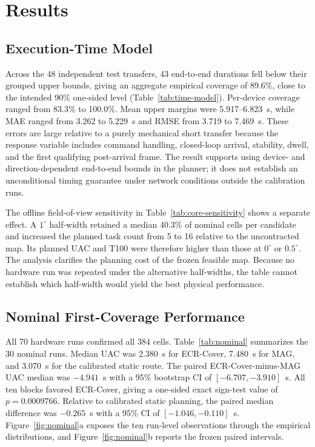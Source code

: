 \section{Results}\label{sec:results}

\subsection{Execution-Time Model}

Across the 48 independent test transfers, 43 end-to-end durations fell below their grouped upper bounds, giving an aggregate empirical coverage of 89.6\%, close to the intended 90\% one-sided level (Table~\ref{tab:time-model}). Per-device coverage ranged from 83.3\% to 100.0\%. Mean upper margins were 5.917--6.823~s, while MAE ranged from 3.262 to 5.229~s and RMSE from 3.719 to 7.469~s. These errors are large relative to a purely mechanical short transfer because the response variable includes command handling, closed-loop arrival, stability, dwell, and the first qualifying post-arrival frame. The result supports using device- and direction-dependent end-to-end bounds in the planner; it does not establish an unconditional timing guarantee under network conditions outside the calibration runs.

The offline field-of-view sensitivity in Table~\ref{tab:core-sensitivity} shows a separate effect. A $1^\circ$ half-width retained a median 40.3\% of nominal cells per candidate and increased the planned task count from 5 to 16 relative to the uncontracted map. Its planned UAC and T100 were therefore higher than those at $0^\circ$ or $0.5^\circ$. The analysis clarifies the planning cost of the frozen feasible map. Because no hardware run was repeated under the alternative half-widths, the table cannot establish which half-width would yield the best physical performance.

\subsection{Nominal First-Coverage Performance}

All 70 hardware runs confirmed all 384 cells. Table~\ref{tab:nominal} summarizes the 30 nominal runs. Median UAC was 2.380~s for ECR-Cover, 7.480~s for MAG, and 3.070~s for the calibrated static route. The paired ECR-Cover-minus-MAG UAC median was $-4.941$~s with a 95\% bootstrap CI of $[-6.707,-3.910]$~s. All ten blocks favored ECR-Cover, giving a one-sided exact sign-test value of $p=0.0009766$. Relative to calibrated static planning, the paired median difference was $-0.265$~s with a 95\% CI of $[-1.046,-0.110]$~s. Figure~\ref{fig:nominal}a exposes the ten run-level observations through the empirical distributions, and Figure~\ref{fig:nominal}b reports the frozen paired intervals.

